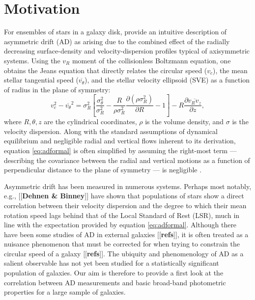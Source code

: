 \documentclass[apj,iop,revtex4,numberedappendix]{emulateapj}
\newcommand{\comment}[2][todo]{{\color{#1}[[{\bf #2}]]}}
\begin{document}

\section{ Motivation }
\label{sec:intro}

For ensembles of stars in a galaxy disk, \citet[][Section
4.4.3]{2008gady.book.....B} provide an intuitive description of
asymmetric drift (AD) as arising due to the combined effect of the
radially decreasing surface-density and velocity-dispersion profiles
typical of axisymmetric systems.  Using the $v_R$ moment of the
collisionless Boltzmann equation, one obtains the Jeans equation
\citep{Jeans1919} that directly relates the circular speed ($v_c$), the
mean stellar tangential speed ($\overline{v_\theta}$), and the stellar
velocity ellipsoid (SVE) as a function of radius in the plane of
symmetry:
%
\begin{equation}
%
v_c^2 - \overline{v_\theta}^2 = \sigma_R^2\left[
\frac{\sigma_\theta^2}{\sigma_R^2} -
\frac{R}{\rho\sigma_R^2}\frac{\partial(\rho\sigma_R^2)}{\partial R} -
1\right] - R\frac{\partial\overline{v_R v_z}}{\partial z},
%
\label{eq:adformal}
%
\end{equation}
%
where $R,\theta,z$ are the cylindrical coordinates, $\rho$ is the volume
density, and $\sigma$ is the velocity dispersion.  Along with the
standard assumptions of dynamical equilibrium and negligible radial and
vertical flows inherent to its derivation, equation \ref{eq:adformal} is
often simplified by assuming the right-most term --- describing the
covariance between the radial and vertical motions as a function of
perpendicular distance to the plane of symmetry --- is negligible
\citep{1991ApJ...368...79A}.

Asymmetric drift has been measured in numerous systems.  Perhaps most
notably, e.g., \comment{Dehnen \& Binney} have shown that populations of
stars show a direct correlation between their velocity dispersion and
the degree to which their mean rotation speed lags behind that of the
Local Standard of Rest (LSR), much in line with the expectation provided
by equation \ref{eq:adformal}.  Although there have been some studies of
AD in external galaxies \comment{refs}, it is often treated as a
nuisance phenomenon that must be corrected for when trying to constrain
the circular speed of a galaxy \comment{refs}.  The ubiquity and
phenomenology of AD as a salient observable has not yet been studied for
a statistically significant population of galaxies.  Our aim is
therefore to provide a first look at the correlation between AD
measurements and basic broad-band photometric properties for a large
sample of galaxies.
\end{document}
